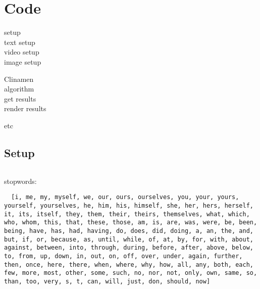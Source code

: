 
\chapter{Code}
\label{app:code}

setup\\
 text setup\\
 video setup\\
 image setup

Clinamen\\
 algorithm\\
 get results\\
 render results

 etc

\section{Setup}

\inputminted[firstline=1,lastline=9]{python}{back/code/textsurfer.py}

stopwords:
\begin{verbatim}
  [i, me, my, myself, we, our, ours, ourselves, you, your, yours, yourself, yourselves, he, him, his, himself, she, her, hers, herself, it, its, itself, they, them, their, theirs, themselves, what, which, who, whom, this, that, these, those, am, is, are, was, were, be, been, being, have, has, had, having, do, does, did, doing, a, an, the, and, but, if, or, because, as, until, while, of, at, by, for, with, about, against, between, into, through, during, before, after, above, below, to, from, up, down, in, out, on, off, over, under, again, further, then, once, here, there, when, where, why, how, all, any, both, each, few, more, most, other, some, such, no, nor, not, only, own, same, so, than, too, very, s, t, can, will, just, don, should, now]
\end{verbatim}

